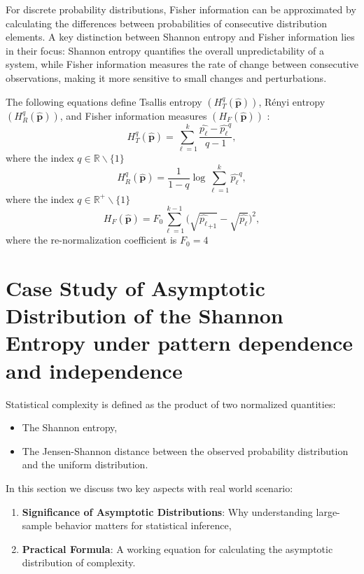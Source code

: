 For discrete probability distributions, Fisher information can be approximated by calculating the differences between probabilities of consecutive distribution elements. A key distinction between Shannon entropy and Fisher information lies in their focus: Shannon entropy quantifies the overall unpredictability of a system, while Fisher information measures the rate of change between consecutive observations, making it more sensitive to small changes and perturbations.

The following equations define Tsallis entropy $	(H_{T}^{q}(\widehat{\mathbf{p}}))$, Rényi entropy $(H_{R}^{q}(\widehat{\mathbf{p}}))$, and Fisher information measures $(H_{F}(\widehat{\mathbf{p}}))$ \cite{sanchez2009discrete} :
\begin{equation}
	H_{T}^{q}(\widehat{\mathbf{p}})=\sum_{\ell=1}^{k}\dfrac{\widehat{p_\ell}-\widehat{p_\ell}^q}{q-1},
\end{equation}
where the index $q\in \mathbb{R}\backslash \{1\}$
\begin{equation}
	H_{R}^{q}(\widehat{\mathbf{p}})=\dfrac{1}{1-q} \log \sum_{\ell=1}^{k}{\widehat{p_\ell}}^q,
\end{equation}
where the index $q\in \mathbb{R}^{+}\backslash \{1\}$
\begin{equation}
	H_F(\widehat{\mathbf{p}})=F_0\sum_{\ell=1}^{k-1}\Big(\sqrt{\widehat{p_\ell}_{+1}}-\sqrt{\widehat{p_\ell}}\Big)^2 ,
\end{equation}
where the re-normalization coefficient is $F_0=4$ \cite{sanchez2009discrete}

\section{Case Study of Asymptotic Distribution of the Shannon Entropy under pattern dependence and independence} \label{Sec:CaseStudy} 

Statistical complexity is defined as the product of two normalized quantities:
\begin{itemize}
	\item The Shannon entropy,
	\item The Jensen-Shannon distance between the observed probability distribution and the uniform distribution. 
\end{itemize}

In this section we discuss two key aspects with real world scenario:
\begin{enumerate}
	\item \textbf{Significance of Asymptotic Distributions}: Why understanding large-sample behavior matters for statistical inference,
	\item \textbf{Practical Formula}: A working equation for calculating the asymptotic distribution of complexity.
\end{enumerate}

